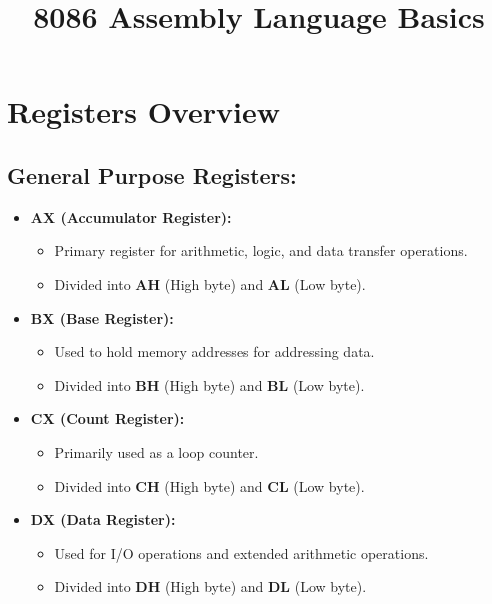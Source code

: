 \documentclass[a4paper,12pt]{article}
\title{8086 Assembly Language Basics}
\author{}
\date{}
\begin{document}
\maketitle

\section*{Registers Overview}

\subsection*{General Purpose Registers:}
\begin{itemize}
    \item \textbf{AX (Accumulator Register):}
    \begin{itemize}
        \item Primary register for arithmetic, logic, and data transfer operations.
        \item Divided into \textbf{AH} (High byte) and \textbf{AL} (Low byte).
    \end{itemize}

    \item \textbf{BX (Base Register):}
    \begin{itemize}
        \item Used to hold memory addresses for addressing data.
        \item Divided into \textbf{BH} (High byte) and \textbf{BL} (Low byte).
    \end{itemize}

    \item \textbf{CX (Count Register):}
    \begin{itemize}
        \item Primarily used as a loop counter.
        \item Divided into \textbf{CH} (High byte) and \textbf{CL} (Low byte).
    \end{itemize}

    \item \textbf{DX (Data Register):}
    \begin{itemize}
        \item Used for I/O operations and extended arithmetic operations.
        \item Divided into \textbf{DH} (High byte) and \textbf{DL} (Low byte).
    \end{itemize}
\end{itemize}
\end{document}
